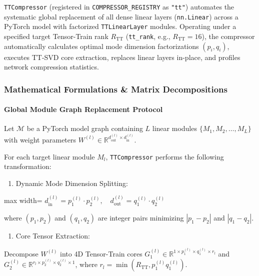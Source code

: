 \texttt{TTCompressor} (registered in \texttt{COMPRESSOR\_REGISTRY} as \texttt{"tt"}) automates the systematic global replacement of all dense linear layers (\texttt{nn.Linear}) across a PyTorch model with factorized \texttt{TTLinearLayer} modules. Operating under a specified target Tensor-Train rank $R_{\text{TT}}$ (\texttt{tt\_rank}, e.g., $R_{\text{TT}} = 16$), the compressor automatically calculates optimal mode dimension factorizations $(p_i, q_i)$, executes TT-SVD core extraction, replaces linear layers in-place, and profiles network compression statistics.


\subsubsection*{Mathematical Formulations \& Matrix Decompositions}

\paragraph{Global Module Graph Replacement Protocol}
Let $\mathcal{M}$ be a PyTorch model graph containing $L$ linear modules $\{M_1, M_2, \dots, M_L\}$ with weight parameters $W^{(l)} \in \mathbb{R}^{d_{\text{out}}^{(l)} \times d_{\text{in}}^{(l)}}$.

For each target linear module $M_l$, \texttt{TTCompressor} performs the following transformation:

\begin{enumerate}
\item Dynamic Mode Dimension Splitting:
\end{enumerate}
\begin{center}
\begin{adjustbox}{max width=\columnwidth}
$\displaystyle
d_{\text{in}}^{(l)} = p_1^{(l)} \cdot p_2^{(l)}, \quad d_{\text{out}}^{(l)} = q_1^{(l)} \cdot q_2^{(l)}
$
\end{adjustbox}
\end{center}

where $(p_1, p_2)$ and $(q_1, q_2)$ are integer pairs minimizing $|p_1 - p_2|$ and $|q_1 - q_2|$.

\begin{enumerate}
\item Core Tensor Extraction:
\end{enumerate}
Decompose $W^{(l)}$ into 4D Tensor-Train cores $G_1^{(l)} \in \mathbb{R}^{1 \times p_1^{(l)} \times q_1^{(l)} \times r_l}$ and $G_2^{(l)} \in \mathbb{R}^{r_l \times p_2^{(l)} \times q_2^{(l)} \times 1}$, where $r_l = \min(R_{\text{TT}}, p_1^{(l)} q_1^{(l)})$.

